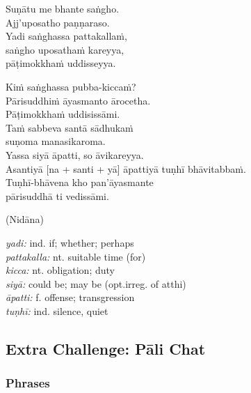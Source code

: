 \documentclass[11pt,oneside]{memoir}
\begin{document}
\begin{widecols}


Suṇātu me bhante saṅgho. \\[0pt]
Ajj'uposatho paṇṇaraso. \\[0pt]
Yadi saṅghassa pattakallaṁ, \\[0pt]
saṅgho uposathaṁ kareyya, \\[0pt]
pāṭimokkhaṁ uddisseyya.

Kiṁ saṅghassa pubba-kiccaṁ? \\[0pt]
Pārisuddhiṁ āyasmanto ārocetha. \\[0pt]
Pāṭimokkhaṁ uddisissāmi. \\[0pt]
Taṁ sabbeva santā sādhukaṁ \\[0pt]
suṇoma manasikaroma. \\[0pt]
Yassa siyā āpatti, so āvikareyya. \\[0pt]
Asantiyā [na + santi + yā] āpattiyā tuṇhī bhāvitabbaṁ. \\[0pt]
Tuṇhī-bhāvena kho pan'āyasmante \\[0pt]
pārisuddhā ti vedissāmi.

(Nidāna)

\columnbreak

\emph{yadi:} ind. if; whether; perhaps \\[0pt]
\emph{pattakalla:} nt. suitable time (for) \\[0pt]
\emph{kicca:} nt. obligation; duty \\[0pt]
\emph{siyā:} could be; may be (opt.irreg. of atthi) \\[0pt]
\emph{āpatti:} f. offense; transgression \\[0pt]
\emph{tuṇhī:} ind. silence, quiet
\end{widecols}

\clearpage

\subsection{Extra Challenge: Pāli Chat}
\label{sec:org6fefece}
\subsubsection{Phrases}
\label{sec:orgd299398}
\end{document}
